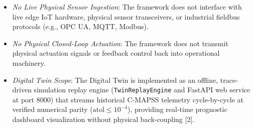 \documentclass[12pt,a4paper]{article}
\begin{document}
\begin{itemize}
\begin{itemize}
        \item \textit{No Live Physical Sensor Ingestion}: The framework does not interface with live edge IoT hardware, physical sensor transceivers, or industrial fieldbus protocols (e.g., OPC UA, MQTT, Modbus).
        \item \textit{No Physical Closed-Loop Actuation}: The framework does not transmit physical actuation signals or feedback control back into operational machinery.
        \item \textit{Digital Twin Scope}: The Digital Twin is implemented as an offline, trace-driven simulation replay engine (\texttt{TwinReplayEngine} and FastAPI web service at port 8000) that streams historical C-MAPSS telemetry cycle-by-cycle at verified numerical parity ($\text{atol} \le 10^{-4}$), providing real-time prognostic dashboard visualization without physical back-coupling [2].
    \end{itemize}
\end{itemize}
\end{document}
